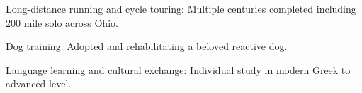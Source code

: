 

\begin{cvitemsdense}

	\vspace{4.0mm}
  	\item{Long-distance running and cycle touring: Multiple centuries completed including 200 mile solo across Ohio.}
        \item{Dog training: Adopted and rehabilitating a beloved reactive dog.}
        \item{Language learning and cultural exchange: Individual study in modern Greek to advanced level.}


\end{cvitemsdense}
